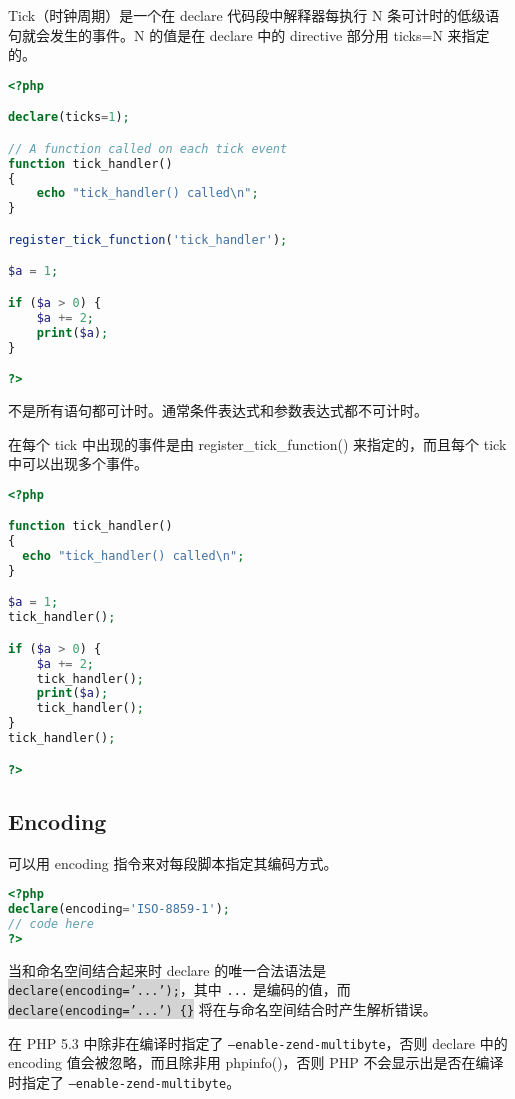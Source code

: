 Tick（时钟周期）是一个在 declare 代码段中解释器每执行 N 条可计时的低级语句就会发生的事件。N 的值是在 declare 中的 directive 部分用 ticks=N 来指定的。

\begin{lstlisting}[language=PHP]
<?php

declare(ticks=1);

// A function called on each tick event
function tick_handler()
{
    echo "tick_handler() called\n";
}

register_tick_function('tick_handler');

$a = 1;

if ($a > 0) {
    $a += 2;
    print($a);
}

?>
\end{lstlisting}

不是所有语句都可计时。通常条件表达式和参数表达式都不可计时。

在每个 tick 中出现的事件是由 register\_tick\_function() 来指定的，而且每个 tick 中可以出现多个事件。

\begin{lstlisting}[language=PHP]
<?php

function tick_handler()
{
  echo "tick_handler() called\n";
}

$a = 1;
tick_handler();

if ($a > 0) {
    $a += 2;
    tick_handler();
    print($a);
    tick_handler();
}
tick_handler();

?>
\end{lstlisting}

\subsection{Encoding}

可以用 encoding 指令来对每段脚本指定其编码方式。


\begin{lstlisting}[language=PHP]
<?php
declare(encoding='ISO-8859-1');
// code here
?>
\end{lstlisting}



当和命名空间结合起来时 declare 的唯一合法语法是 \colorbox{lightgray}{\texttt{declare(encoding='...');}}，其中 \texttt{...} 是编码的值，而 \colorbox{lightgray}{\texttt{declare(encoding='...') \{\}}} 将在与命名空间结合时产生解析错误。

在 PHP 5.3 中除非在编译时指定了 \texttt{--enable-zend-multibyte}，否则 declare 中的 encoding 值会被忽略，而且除非用 phpinfo()，否则 PHP 不会显示出是否在编译时指定了 \texttt{--enable-zend-multibyte}。

